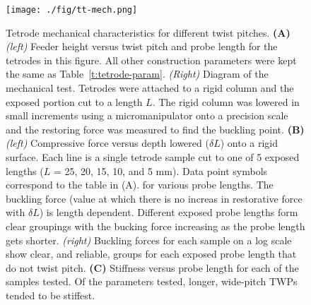 \documentclass[11pt,a4paper]{article}
\begin{document}
\begin{table}[!htbp]
\begin{tabular}{rlP{3cm}P{3cm}}
\bottomrule
\end{tabular}
\end{table}

\begin{figure}
\centering
\texttt{[image: ./fig/tt-mech.png]}
\caption{Tetrode mechanical characteristics for different twist pitches.
    \textbf{(A)} \textit{(left)} Feeder height versus twist pitch and probe
    length for the tetrodes in this figure. All other construction parameters
    were kept the same as Table~\ref{t:tetrode-param}.  \textit{(Right)}
    Diagram of the mechanical test. Tetrodes were attached to a rigid column
    and the exposed portion cut to a length $L$. The rigid column was lowered
    in small increments using a micromanipulator onto a precision scale and the
    restoring force was measured to find the buckling point.
    \textbf{(B)} \textit{(left)} Compressive force versus depth lowered
    ($\delta L$) onto a rigid surface.  Each line is a single tetrode sample
    cut to one of 5 exposed lengths ($L$ = 25, 20, 15, 10, and 5 mm). Data
    point symbols correspond to the table in (A).  for various probe lengths.
    The buckling force (value at which there is no increas in restorative force
    with $\delta L$) is length dependent. Different exposed probe lengths form
    clear groupings with the bucking force increasing as the probe length gets
    shorter. \textit{(right)} Buckling forces for each sample on a log scale
    show clear, and reliable, groups for each exposed probe length that do not
    twist pitch.
    \textbf{(C)} Stiffness versus probe length for each of the samples tested.
    Of the parameters tested, longer, wide-pitch TWPs tended to be stiffest.
}
\label{f:trode-char}
\end{figure}
\end{document}
